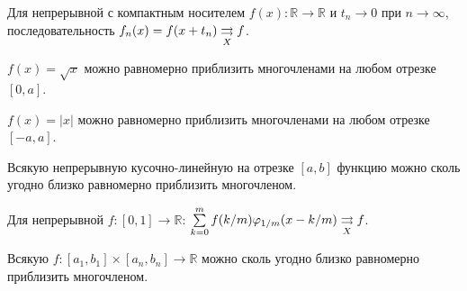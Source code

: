 
\begin{to_lem}
    Для непрерывной с компактным носителем $f(x) \colon \mathbb{R} \to \mathbb{R}$ и $t_n \to 0$ при $n \to \infty$, последовательность $f_n(x) = f(x + t_n) \underset{X}{\rightrightarrows} f$.
\end{to_lem}

\begin{to_lem}
    $f(x) = \sqrt{x}$ можно равномерно приблизить многочленами на любом отрезке $[0,a]$.
\end{to_lem}

\begin{to_lem}
    $f(x) = |x|$ можно равномерно приблизить многочленами на любом отрезке $[-a,a]$.
\end{to_lem}

\begin{to_thr}
    Всякую непрерывную кусочно-линейную на отрезке $[a, b]$ функцию можно сколь угодно близко равномерно приблизить многочленом.
\end{to_thr}

\begin{to_lem}
    Для непрерывной $f \colon [0,1] \to \mathbb{R}$: $\sum\limits_{k = 0}^{m} f(k/m) \varphi_{1/m} (x - k/m) \underset{X}{\rightrightarrows} f$.
\end{to_lem}

\begin{to_thr}
    Всякую $f \colon [a_1, b_1] \times [a_n, b_n] \to \mathbb{R}$ можно сколь угодно близко
равномерно приблизить многочленом.
\end{to_thr}
